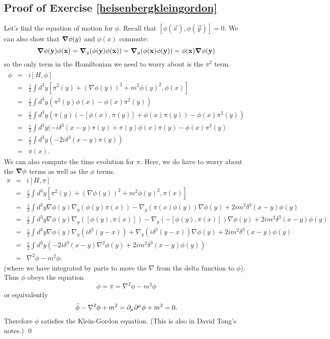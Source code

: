\subsection*{Proof of Exercise \ref{heisenbergkleingordon}}
Let's find the equation of motion for $\phi.$ Recall that $[\phi(\vec x),\phi(\vec y)]=0$. We can also show that $\mbox{\boldmath$ \nabla $} \phi(y)$ and $\phi(x)$ commute: 
$$
\mbox{\boldmath$ \nabla $} \phi(\boldsymbol{\mathbf{y}})\phi(\boldsymbol{\mathbf{x}}) = \mbox{\boldmath$ \nabla $} _y (\phi(\boldsymbol{\mathbf{y}}) \phi (\boldsymbol{\mathbf{x}})) = \mbox{\boldmath$ \nabla $} _y (\phi(\boldsymbol{\mathbf{x}}) \phi(\boldsymbol{\mathbf{y}})) = \phi (\boldsymbol{\mathbf{x}}) \mbox{\boldmath$ \nabla $} \phi (\boldsymbol{\mathbf{y}})$$
so the only term in the Hamiltonian we need to worry about is the $\pi^2$ term.
\begin{eqnarray*}
\dot \phi &=& i[H,\phi]\\
&=&\frac{i}{2} \int d^3 y \left[\pi^2(y)+(\nabla \phi(y))^2 + m^2\phi(y)^2, \phi(x)\right]\\
&=&\frac{i}{2} \int d^3 y (\pi^2(y) \phi(x) - \phi(x) \pi^2(y))\\
&=&\frac{i}{2} \int d^3 y (\pi(y) (-[\phi(x),\pi(y)]+\phi(x) \pi(y))-\phi(x) \pi^2(y))\\
&=&\frac{i}{2} \int d^3 y (-i\delta^3(x-y) \pi(y)+ \pi(y) \phi(x) \pi(y) - \phi(x) \pi^2(y)\\
&=&\frac{i}{2} \int d^3 y (-2i \delta^3(x-y) \pi(y))\\
&=& \pi(x).
\end{eqnarray*}
We can also compute the time evolution for $\pi$. Here, we do have to worry about the $\mbox{\boldmath$ \nabla $} \phi$ terms as well as the $\phi$ terms.
\begin{eqnarray*}
\dot \pi &=& i[H,\pi]\\
&=&\frac{i}{2} \int d^3 y \left[\pi^2(y)+(\nabla \phi(y))^2 + m^2\phi(y)^2, \pi(x)\right]\\
&=&\frac{i}{2} \int d^3 y \nabla \phi(y) \nabla_y (\phi(y) \pi(x))- \nabla_y (\pi(x) \phi(y)) \nabla \phi(y)+2i m^2 \delta^3(x-y) \phi(y)\\
&=& \frac{i}{2} \int d^3 y \nabla \phi(y) \nabla_y([ \phi(y),\pi(x)]) - \nabla_y(-[\phi(y),\pi(x)]) \nabla \phi(y)+2i m^2 \delta^3(x-y) \phi(y)\\
&=&\frac{i}{2} \int d^3 y \nabla \phi(y) \nabla_y(i\delta^3(y-x)) + \nabla_y(i\delta^3(y-x)) \nabla \phi(y)+2i m^2 \delta^3(x-y) \phi(y)\\
&=& \frac{i}{2} \int d^3 y \left(-2i \delta^3(x-y) \nabla^2 \phi(y) + 2i m^2 \delta^3(x-y) \phi(y) \right)\\
&=& \nabla^2 \phi-m^2 \phi.
\end{eqnarray*}
(where we have integrated by parts to move the $\nabla$ from the delta function to $\phi$). Thus $\phi$ obeys the equation
$$\ddot \phi = \dot \pi = \nabla^2 \phi - m^2 \phi$$
or equivalently
$$\ddot \phi - \nabla^2 \phi + m^2 = \partial_\mu \partial^\mu \phi +m^2=0.$$
Therefore $\phi$ satisfies the Klein-Gordon equation. (This is also in David Tong's notes.) \qed

